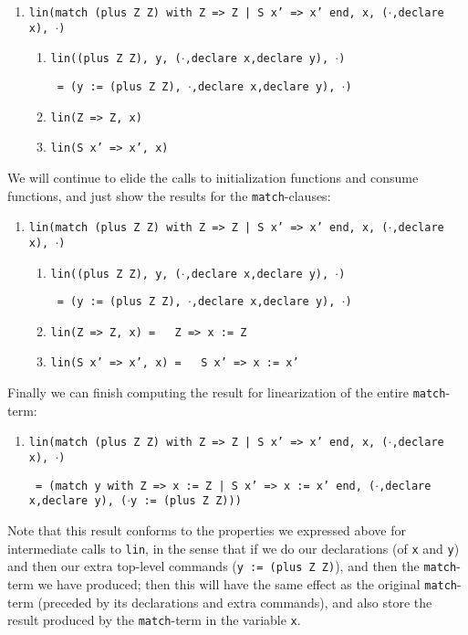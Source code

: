 \documentclass{book}[12pt]
\begin{document}
{\small
\begin{enumerate}
\item \texttt{lin(match (plus Z Z) with Z => Z | S x' => x' end, x, (}$\cdot$\texttt{,declare x), }$\cdot$\texttt{)}
\begin{enumerate}
\item \texttt{lin((plus Z Z), y, (}$\cdot$\texttt{,declare x,declare y), }$\cdot$\texttt{)}

\texttt{ = (y := (plus Z Z), }$\cdot$\texttt{,declare x,declare y), }$\cdot$\texttt{)} 
\item \texttt{lin(Z => Z, x)}
\item \texttt{lin(S x' => x', x)}
\end{enumerate}
\end{enumerate}
}

\noindent We will continue to elide the calls to initialization
functions and consume functions, and just show the results for the
\texttt{match}-clauses:

{\small
\begin{enumerate}
\item \texttt{lin(match (plus Z Z) with Z => Z | S x' => x' end, x, (}$\cdot$\texttt{,declare x), }$\cdot$\texttt{)}
\begin{enumerate}
\item \texttt{lin((plus Z Z), y, (}$\cdot$\texttt{,declare x,declare y), }$\cdot$\texttt{)}

\texttt{ = (y := (plus Z Z), }$\cdot$\texttt{,declare x,declare y), }$\cdot$\texttt{)} 
\item \texttt{lin(Z => Z, x) = \ \   Z => x := Z}
\item \texttt{lin(S x' => x', x) = \ \  S x' => x := x'}
\end{enumerate}
\end{enumerate}
}

\noindent Finally we can finish computing the result for linearization of the entire \texttt{match}-term:


{\small
\begin{enumerate}
\item \texttt{lin(match (plus Z Z) with Z => Z | S x' => x' end, x, (}$\cdot$\texttt{,declare x), }$\cdot$\texttt{)}

\texttt{ = (match y with Z => x := Z | S x' => x := x' end, (}$\cdot$\texttt{,declare x,declare y), (}$\cdot$\texttt{y := (plus Z Z)))}
\end{enumerate}
}

\noindent Note that this result conforms to the properties we
expressed above for intermediate calls to \texttt{lin}, in the sense
that if we do our declarations (of \texttt{x} and \texttt{y}) and then
our extra top-level commands (\texttt{y := (plus Z Z)}), and then the
\texttt{match}-term we have produced; then this will have the same
effect as the original \texttt{match}-term (preceded by its
declarations and extra commands), and also store the result produced
by the \texttt{match}-term in the variable \texttt{x}.
\end{document}
